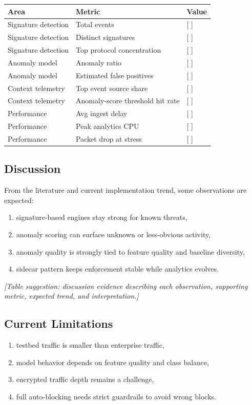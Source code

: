 \documentclass[12pt,a4paper]{article}
\begin{document}
\begin{table}[h!]
\centering
\begin{tabular}{lll}
\toprule
Area & Metric & Value \\
\midrule
Signature detection & Total events & [ ] \\
Signature detection & Distinct signatures & [ ] \\
Signature detection & Top protocol concentration & [ ] \\
Anomaly model & Anomaly ratio & [ ] \\
Anomaly model & Estimated false positives & [ ] \\
Context telemetry & Top event source share & [ ] \\
Context telemetry & Anomaly-score threshold hit rate & [ ] \\
Performance & Avg ingest delay & [ ] \\
Performance & Peak analytics CPU & [ ] \\
Performance & Packet drop at stress & [ ] \\
\bottomrule
\end{tabular}
\end{table}

\subsection{Discussion}

From the literature and current implementation trend, some observations are expected:

\begin{enumerate}
    \item signature-based engines stay strong for known threats,
    \item anomaly scoring can surface unknown or less-obvious activity,
    \item anomaly quality is strongly tied to feature quality and baseline diversity,
    \item sidecar pattern keeps enforcement stable while analytics evolves.
\end{enumerate}

\textit{[Table suggestion: discussion evidence describing each observation, supporting metric, expected trend, and interpretation.]}

\subsection{Current Limitations}
\begin{enumerate}
    \item testbed traffic is smaller than enterprise traffic,
    \item model behavior depends on feature quality and class balance,
    \item encrypted traffic depth remains a challenge,
    \item full auto-blocking needs strict guardrails to avoid wrong blocks.
\end{enumerate}
\end{document}
